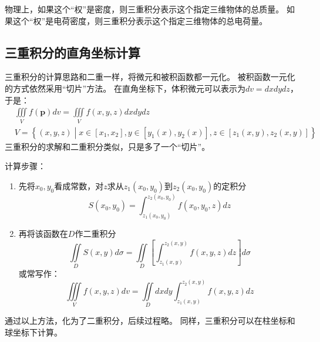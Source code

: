 物理上，如果这个“权”是密度，则三重积分表示这个指定三维物体的总质量。
如果这个“权”是电荷密度，则三重积分表示这个指定三维物体的总电荷量。

\subsection{三重积分的直角坐标计算}

三重积分的计算思路和二重一样，将微元和被积函数都一元化。
被积函数一元化的方式依然采用“切片”方法。
在直角坐标下，体积微元可以表示为$dv=dxdydz$，于是：
\begin{align*}
&\iiint\limits_V{f\left( \boldsymbol{p} \right) dv}=\iiint\limits_V{f\left( x,y,z \right) dxdydz} \\
&V=\left\{ \left( x,y,z \right) \middle| x\in \left[ x_1,x_2 \right] ,y\in \left[ y_1\left( x \right) ,y_2\left( x \right) \right] ,z\in \left[ z_1\left( x,y \right) ,z_2\left( x,y \right) \right] \right\}
\end{align*}
三重积分的求解和二重积分类似，只是多了一个“切片”。

计算步骤：
\begin{enumerate}
    \item 先将$x_0,y_0$看成常数，对$z$求从$z_1\left( x_0,y_0 \right) $到$z_2\left( x_0,y_0 \right) $的定积分
    \[
    S\left( x_0,y_0 \right) =\int_{z_1\left( x_0,y_0 \right)}^{z_2\left( x_0,y_0 \right)}{f\left( x_0,y_0,z \right) dz}
    \]
    \item 再将该函数在$D$作二重积分
    \[
    \iint\limits_D{S\left( x,y \right) d\sigma}=\iint\limits_D{\left[ \int_{z_1\left( x,y \right)}^{z_2\left( x,y \right)}{f\left( x,y,z \right) dz} \right] d\sigma}
    \]
    或常写作：
    \[
    \iiint\limits_V{f\left( x,y,z \right) dv}=\iint\limits_D{dxdy\int_{z_1\left( x,y \right)}^{z_2\left( x,y \right)}{f\left( x,y,z \right) dz}}
    \]
\end{enumerate}

通过以上方法，化为了二重积分，后续过程略。
同样，三重积分可以在柱坐标和球坐标下计算。




